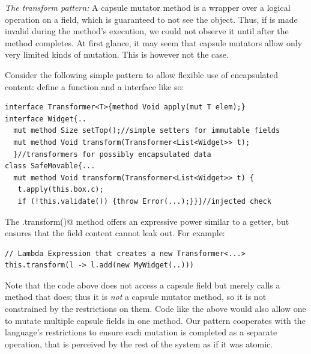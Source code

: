 \noindent\textit{The transform pattern:}
A capsule mutator method is a wrapper over a logical operation on a field, which is guaranteed to not see the \Q@this@ object.
Thus, if \Q@this@ is made invalid during 
the method's execution, we could not observe it until after the method completes.
At first glance, it may seem that capsule mutators allow only very limited kinds of mutation.
This is however not the case. 

Consider the following
simple pattern to allow flexible use of encapsulated content: define a \Q@transform@ function and a \Q@ItemTransformer@ interface like so:
\saveSpace
\begin{lstlisting}
interface Transformer<T>{method Void apply(mut T elem);}
interface Widget{..
  mut method Size setTop();//simple setters for immutable fields
  mut method Void transform(Transformer<List<Widget>> t);
  }//transformers for possibly encapsulated data
class SafeMovable{...
  mut method Void transform(Transformer<List<Widget>> t) {
   t.apply(this.box.c);
   if (!this.validate()) {throw Error(...);}}}//injected check
\end{lstlisting}
The \Q@.transform()@ method 
offers an expressive power similar to a
\Q@mut@ getter, but ensures that 
the field content cannot leak out.
For example:
\begin{lstlisting}[escapechar=\%]
// Lambda Expression that creates a new Transformer<...>
this.transform(l -> l.add(new MyWidget(..)))
\end{lstlisting}


Note that the code above does not access a capsule field but merely calls a method that does; thus
it is \emph{not} a capsule mutator method, so it is not constrained by the restrictions on them. Code like the above would also allow one to mutate multiple capsule fields in one method.
Our pattern cooperates with the language’s restrictions to ensure each mutation is completed as a separate operation, that is perceived by the rest of the system
as if it was atomic.%


